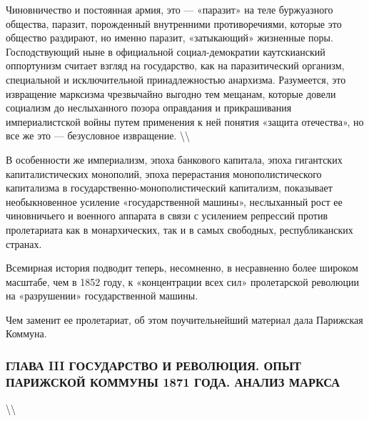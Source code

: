 \documentclass[12pt]{article}
\newcommand\ellipsis{%
  \textbackslash\thinspace\textellipsis\textbackslash
}
\newcommand{\parnum}{(\arabic{parcount})}
\newcounter{parcount}
\newenvironment{parnumbers}{%
  \par%
  \everypar{\noindent \stepcounter{parcount}\marginpar[]{\parnum}}%
}{}
\begin{document}
\begin{parnumbers}
Чиновничество и постоянная армия, это — «паразит» на теле буржуазного общества, паразит, порожденный внутренними противоречиями, которые это общество раздирают, но именно паразит, «затыкающий» жизненные поры. Господствующий ныне в официальной социал-демократии каутскианский оппортунизм считает взгляд на государство, как на паразитический организм, специальной и исключительной принадлежностью анархизма. Разумеется, это извращение марксизма чрезвычайно выгодно тем мещанам, которые довели социализм до неслыханного позора оправдания и прикрашивания империалистской войны путем применения к ней понятия «защита отечества», но все же это — безусловное извращение. \ellipsis

В особенности же империализм, эпоха банкового капитала, эпоха гигантских капиталистических монополий, эпоха перерастания монополистического капитализма в государственно-монополистический капитализм, показывает необыкновенное усиление «государственной машины», неслыханный рост ее чиновничьего и военного аппарата в связи с усилением репрессий против пролетариата как в монархических, так и в самых свободных, республиканских странах.

Всемирная история подводит теперь, несомненно, в несравненно более широком масштабе, чем в 1852 году, к «концентрации всех сил» пролетарской революции на «разрушении» государственной машины.

Чем заменит ее пролетариат, об этом поучительнейший материал дала Парижская Коммуна.
\end{parnumbers}

\subsubsection*{ГЛАВА III ГОСУДАРСТВО И РЕВОЛЮЦИЯ. ОПЫТ ПАРИЖСКОЙ КОММУНЫ 1871 ГОДА. АНАЛИЗ МАРКСА}

\ellipsis
\end{document}
